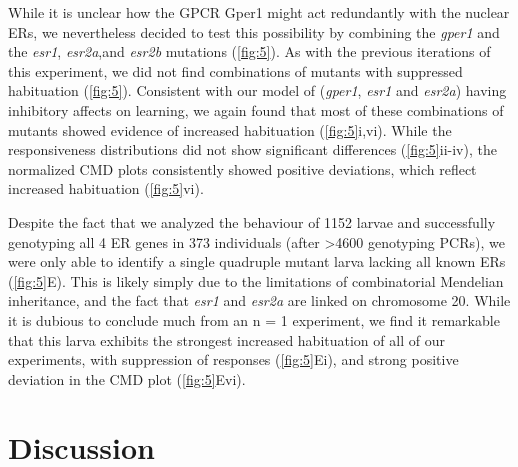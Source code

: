 \documentclass[10pt,lineno]{RandlettLab_elife}
\begin{document}
{\begin{figure}
\begin{fullwidth}
\begin{center}
\label{fig:5}
\end{center}
\end{fullwidth}
\end{figure}


While it is unclear how the GPCR Gper1 might act redundantly with the nuclear ERs, we nevertheless decided to test this possibility by combining the \emph{gper1} and the \emph{esr1}, \emph{esr2a},and \emph{esr2b} mutations (\autoref{fig:5}). 
As with the previous iterations of this experiment, we did not find combinations of mutants with suppressed habituation (\autoref{fig:5}). 
Consistent with our model of (\emph{gper1}, \emph{esr1} and \emph{esr2a}) having inhibitory affects on learning, we again found that most of these combinations of mutants showed evidence of increased habituation (\autoref{fig:5}i,vi).
While the  responsiveness distributions did not show significant differences (\autoref{fig:5}ii-iv), the normalized CMD plots consistently showed positive deviations, which reflect increased habituation (\autoref{fig:5}vi).

Despite the fact that we analyzed the behaviour of 1152 larvae and successfully genotyping all 4 ER genes in 373 individuals (after \textgreater 4600 genotyping PCRs), we were only able to identify a single quadruple mutant larva lacking all known ERs (\autoref{fig:5}E). 
This is likely simply due to the limitations of combinatorial Mendelian inheritance, and the fact that \emph{esr1} and \emph{esr2a} are linked on chromosome 20.   
While it is dubious to conclude much from an n = 1 experiment, we find it remarkable that this larva exhibits the strongest increased habituation of all of our experiments, with suppression of responses (\autoref{fig:5}Ei), and strong positive deviation in the CMD plot (\autoref{fig:5}Evi). 

\section{Discussion}

}
\end{document}

